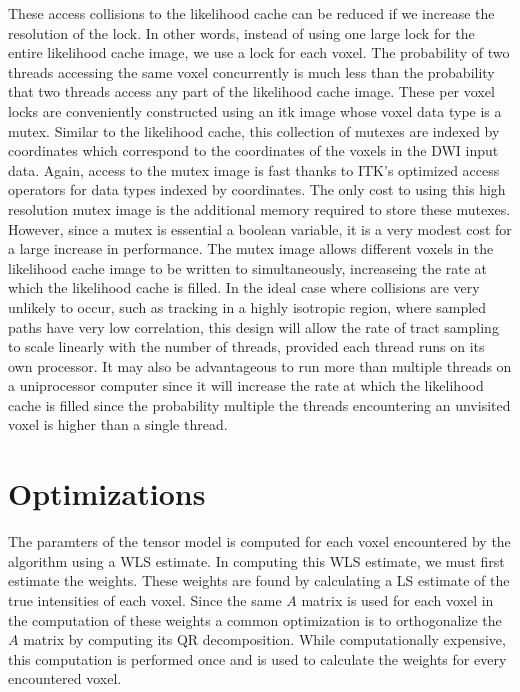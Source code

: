 These access collisions to the likelihood cache can be reduced if we increase the resolution of the lock.  In other words, instead of using one large lock for the entire likelihood cache image, we use a lock for each voxel.  The probability of two threads accessing the same voxel concurrently is much less than the probability that two threads access any part of the likelihood cache image.  These per voxel locks are conveniently constructed using an itk image whose voxel data type is a mutex.  Similar to the likelihood cache, this collection of mutexes are indexed by coordinates which correspond to the coordinates of the voxels in the DWI input data.  Again, access to the mutex image is fast thanks to ITK's optimized access operators for data types indexed by coordinates.  The only cost to using this high resolution mutex image is the additional memory required to store these mutexes.  However, since a mutex is essential a boolean variable, it is a very modest cost for a large increase in performance.  The mutex image allows different voxels in the likelihood cache image to be written to simultaneously, increaseing the rate at which the likelihood cache is filled.  In the ideal case where collisions are very unlikely to occur, such as tracking in a highly isotropic region, where sampled paths have very low correlation, this design will allow the rate of tract sampling to scale linearly with the number of threads, provided each thread runs on its own processor.  It may also be advantageous to run more than multiple threads on a uniprocessor computer since it will increase the rate at which the likelihood cache is filled since the probability multiple the threads encountering an unvisited voxel is higher than a single thread.

\section{Optimizations}
The paramters of the tensor model is computed for each voxel encountered by the algorithm using a WLS estimate.  In computing this WLS estimate, we must first estimate the weights.  These weights are found by calculating a LS estimate of the true intensities of each voxel.  Since the same $A$ matrix is used for each voxel in the computation of these weights a common optimization is to orthogonalize the $A$ matrix by computing its QR decomposition.  While computationally expensive, this computation is performed once and is used to calculate the weights for every encountered voxel.

